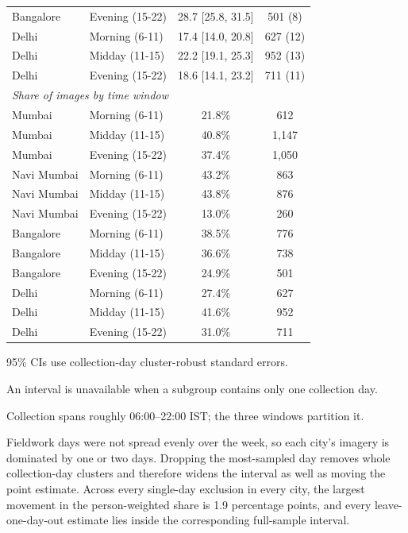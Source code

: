 \begin{table}[t]
\begin{threeparttable}
\begin{tabular}{@{\extracolsep{0pt}}llcc}
Bangalore & Evening (15-22) & 28.7 [25.8, 31.5] & 501 (8) \\
Delhi & Morning (6-11) & 17.4 [14.0, 20.8] & 627 (12) \\
Delhi & Midday (11-15) & 22.2 [19.1, 25.3] & 952 (13) \\
Delhi & Evening (15-22) & 18.6 [14.1, 23.2] & 711 (11) \\
\midrule
\multicolumn{4}{l}{\textit{Share of images by time window}} \\
\midrule
Mumbai & Morning (6-11) & 21.8\% & 612 \\
Mumbai & Midday (11-15) & 40.8\% & 1,147 \\
Mumbai & Evening (15-22) & 37.4\% & 1,050 \\
Navi Mumbai & Morning (6-11) & 43.2\% & 863 \\
Navi Mumbai & Midday (11-15) & 43.8\% & 876 \\
Navi Mumbai & Evening (15-22) & 13.0\% & 260 \\
Bangalore & Morning (6-11) & 38.5\% & 776 \\
Bangalore & Midday (11-15) & 36.6\% & 738 \\
Bangalore & Evening (15-22) & 24.9\% & 501 \\
Delhi & Morning (6-11) & 27.4\% & 627 \\
Delhi & Midday (11-15) & 41.6\% & 952 \\
Delhi & Evening (15-22) & 31.0\% & 711 \\
\bottomrule
\end{tabular}
\begin{tablenotes}[flushleft]
\item 95\% CIs use collection-day cluster-robust standard errors.
\item An interval is unavailable when a subgroup contains only one collection day.
\item Collection spans roughly 06:00--22:00 IST; the three windows partition it.
\item Fieldwork days were not spread evenly over the week, so each city's imagery is dominated by one or two days. Dropping the most-sampled day removes whole collection-day clusters and therefore widens the interval as well as moving the point estimate. Across every single-day exclusion in every city, the largest movement in the person-weighted share is 1.9 percentage points, and every leave-one-day-out estimate lies inside the corresponding full-sample interval.
\end{tablenotes}
\end{threeparttable}
\end{table}
